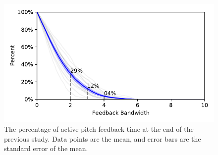 \begin{figure}[tb!]
    \begin{center}
        \includegraphics[width=\linewidth]{figures/Aircraft/p34_feedback_on.pdf}
        \caption[The mean percentage of active pitch feedback time at the end of the previous study]{The percentage of active pitch feedback time at the end of the previous study. Data points are the mean, and error bars are the standard error of the mean.}
        \label{figure-aircraft:pitchfeedback}
    \end{center}
\end{figure}

